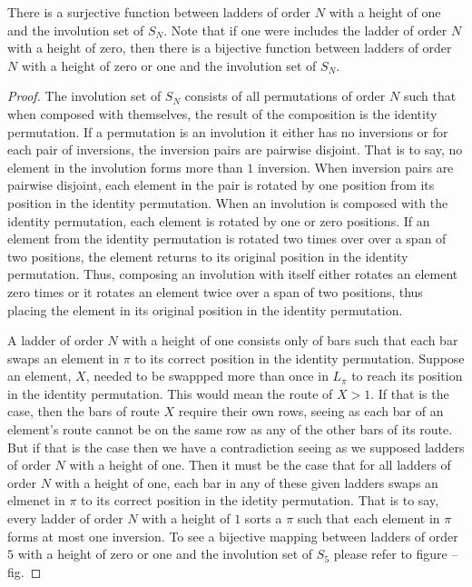 \begin{theorem}
    There is a surjective function between ladders of order $N$ with a height of one and the involution set of $S_{N}$. Note that 
if one were includes the ladder of order $N$ with a height of zero, then there is a bijective function between ladders of order $N$ with a height of zero or one and the involution set of $S_{N}$.
\end{theorem}
\begin{proof}
    The involution set of $S_{N}$ consists of all permutations of order $N$ such that when composed with themselves, the result of the composition is the identity permutation. 
    If a permutation is an involution it either has no inversions or for each pair of inversions, the inversion pairs are pairwise disjoint. That is to say, no element in the 
    involution forms more than $1$ inversion. When inversion pairs are pairwise disjoint, 
    each element in the pair is rotated by one position from its position in the identity permutation. When an involution is composed with the identity permutation, each element is 
    rotated by one or zero positions. If an element from the identity permutation is rotated two times over over a span of two positions, the element returns to its original position in the identity permutation.
    Thus, composing an involution with itself either rotates an element zero times or it rotates an element twice over a span of two positions, thus placing the element in its 
    original position in the identity permutation.\par 
    A ladder of order $N$ with a height of one consists only of bars such that each bar swaps an element in $\pi$ to its correct position in the identity permutation. Suppose an element, $X$,
    needed to be swappped more than once in $L_{\pi}$ to reach its position in the identity permutation. This would mean the route of $X>1$. If that is the case, then the bars of route $X$ require their own rows, seeing as each bar of an element's route 
    cannot be on the same row as any of the other bars of its route. But if that is the case then we have a contradiction seeing as we supposed ladders of order $N$ with a height of one.
    Then it must be the case that for all ladders of order $N$ with a height of one, each bar in any of these given ladders swaps an elmenet in $\pi$ to its correct position 
    in the idetity permutation. That is to say, every ladder of order $N$ with a height of $1$ sorts a $\pi$ such that each element in $\pi$ forms at most 
    one inversion.
    To see a bijective mapping between ladders of order $5$ with a height of zero or one and the involution set of $S_{5}$ please refer to figure --fig.
\end{proof}\pagebreak

